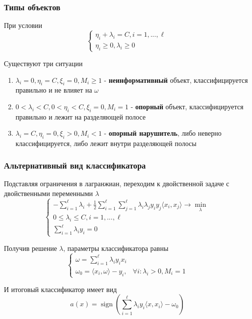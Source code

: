 \documentclass{beamer}
\DeclareMathOperator{\sign}{sign}
\begin{document}
	\begin{frame}
		\frametitle{Типы объектов}
		 При условии
		 \[
		 \begin{cases}
		 	\eta_i + \lambda_i = C, i=1, ..., \ell \\
		 	\eta_i \ge 0, \lambda_i \ge 0
		 \end{cases}
		 \]
		 
		 Существуют три ситуации
		 \begin{enumerate}
		 	\item $\lambda_i = 0, \eta_i = C, \xi_i = 0, M_i \ge 1$
		 	- \textbf{неинформативный}  объект, классифицируется правильно и не влияет на $\omega$
		 	
		 	\item $0 < \lambda_i < C, 0 < \eta_i < C, \xi_i = 0, M_i = 1$
		 	- \textbf{опорный} объект, классифицируется правильно и лежит на разделяющей полосе
		 	
		 	\item $\lambda_i = C, \eta_i = 0, \xi_i > 0, M_i < 1$
		 	- \textbf{опорный нарушитель}, либо неверно классифицируется, либо лежит внутри разделяющей полосы
		 \end{enumerate}
	\end{frame}
	
	\begin{frame}
		\frametitle{Альтернативный вид классификатора}
		Подставляя ограничения в лагранжиан, переходим к двойственной задаче с двойственными переменными $\lambda$
		\[
		\begin{cases}
			- \sum_{i=1}^{\ell} \lambda_i + 
			\frac{1}{2} \sum_{i=1}^{\ell} \sum_{j=1}^{\ell}
			\lambda_i \lambda_j y_i y_j \langle x_i, x_j \rangle
			\rightarrow \min_{\lambda} \\
			
			0 \le \lambda_i \le C, i=1, ..., \ell \\
			
			\sum_{i=1}^{\ell} \lambda_i y_i = 0
		\end{cases}
		\]
		
		 Получив решение $\lambda$, параметры классификатора равны
		\[
		\begin{cases}
			\omega = \sum_{i=1}^{\ell} \lambda_i y_i x_i \\
			\omega_0 = \langle x_i, \omega \rangle - y_i, & \forall i: \lambda_i > 0, M_i = 1
		\end{cases}
		\]
		
		И итоговый классификатор имеет вид
		\[
		a(x) = \sign \left( \sum_{i=1}^{\ell} \lambda_i y_i \langle x, x_i \rangle - \omega_0 \right)
		\]
	\end{frame}
	
\end{document}
